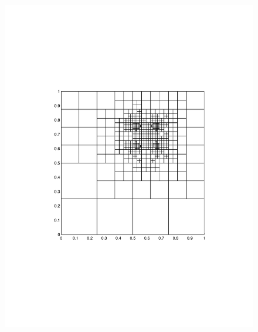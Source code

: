 \documentclass[preprint,10pt]{elsarticle}
\begin{document}
\begin{figure}[!hbtp]
{\includegraphics[scale=0.25]{../pwld_diffusion/results/amr/amr0_8_matlab_mesh_linewidth_1/amr_mms_2_threshold0_8_amr_cy17}
\label{fig:amr_cycle_17}
}
\subfigure[Cycle \# 15]{
}
\end{figure}
\end{document}

